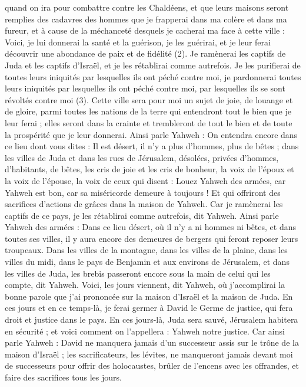 \begin{multicols}{2}
quand on ira pour combattre contre les Chaldéens, et que leurs maisons seront remplies des cadavres des hommes que je frapperai dans ma colère et dans ma fureur, et à cause de la méchanceté desquels je cacherai ma face à cette ville :
Voici, je lui donnerai la santé et la guérison, je les guérirai, et je leur ferai découvrir une abondance de paix et de fidélité\FTNT{} (2).
Je ramènerai les captifs de Juda et les captifs d'Israël, et je les rétablirai comme autrefois.
Je les purifierai de toutes leurs iniquités par lesquelles ils ont péché contre moi, je pardonnerai toutes leurs iniquités par lesquelles ils ont péché contre moi, par lesquelles ils se sont révoltés contre moi\FTNT{} (3).
Cette ville sera pour moi un sujet de joie, de louange et de gloire, parmi toutes les nations de la terre qui entendront tout le bien que je leur ferai ; elles seront dans la crainte et trembleront de tout le bien et de toute la prospérité que je leur donnerai.
Ainsi parle Yahweh : On entendra encore dans ce lieu dont vous dites : Il est désert, il n'y a plus d’hommes, plus de bêtes ; dans les villes de Juda et dans les rues de Jérusalem, désolées, privées d’hommes, d’habitants, de bêtes,
les cris de joie et les cris de bonheur, la voix de l'époux et la voix de l’épouse, la voix de ceux qui disent : Louez Yahweh des armées, car Yahweh est bon, car sa miséricorde demeure à toujours ! Et qui offriront des sacrifices d'actions de grâces dans la maison de Yahweh. Car je ramènerai les captifs de ce pays,  je les rétablirai comme autrefois, dit Yahweh.
Ainsi parle Yahweh des armées : Dans ce lieu désert, où il n'y a ni hommes ni bêtes, et dans toutes ses villes, il y aura encore des demeures de bergers qui feront reposer leurs troupeaux.
Dans les villes de la montagne, dans les villes de la plaine, dans les villes du midi, dans le pays de Benjamin et aux environs de Jérusalem, et dans les villes de Juda, les brebis passeront encore sous la main de celui qui les compte, dit Yahweh.
Voici, les jours viennent, dit Yahweh, où j’accomplirai la bonne parole que j'ai prononcée sur la maison d'Israël et la maison de Juda.
En ces jours et en ce temps-là, je ferai germer à David le Germe de justice, qui fera droit et justice dans le pays.
En ces jours-là, Juda sera sauvé, Jérusalem habitera en sécurité ; et voici comment on l’appellera : Yahweh notre justice.
Car ainsi parle Yahweh : David ne manquera jamais d’un successeur assis sur le trône de la maison d'Israël ;
les sacrificateurs, les lévites, ne manqueront jamais devant moi de successeurs pour offrir des holocaustes, brûler de l’encens avec les offrandes, et faire des sacrifices tous les jours.

\end{multicols}
